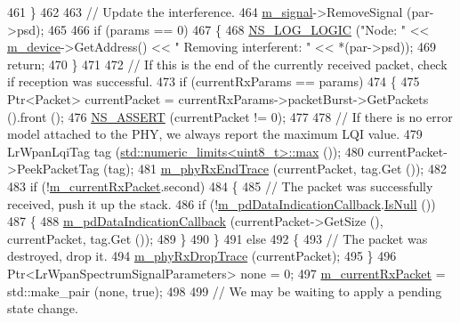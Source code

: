\begin{DoxyCode}
461     \}
462 
463   \textcolor{comment}{// Update the interference.}
464   \hyperlink{classns3_1_1LrWpanPhy_a923130b0bacef678012bcc8fdc68fd10}{m\_signal}->RemoveSignal (par->psd);
465 
466   \textcolor{keywordflow}{if} (params == 0)
467     \{
468       \hyperlink{group__logging_ga88acd260151caf2db9c0fc84997f45ce}{NS\_LOG\_LOGIC} (\textcolor{stringliteral}{"Node: "} << \hyperlink{classns3_1_1LrWpanPhy_a406001d3cb4da3828837c1c1b4629a9c}{m\_device}->GetAddress() << \textcolor{stringliteral}{" Removing interferent: "} << 
      *(par->psd));
469       \textcolor{keywordflow}{return};
470     \}
471 
472   \textcolor{comment}{// If this is the end of the currently received packet, check if reception was successful.}
473   \textcolor{keywordflow}{if} (currentRxParams == params)
474     \{
475       Ptr<Packet> currentPacket = currentRxParams->packetBurst->GetPackets ().front ();
476       \hyperlink{assert_8h_a6dccdb0de9b252f60088ce281c49d052}{NS\_ASSERT} (currentPacket != 0);
477 
478       \textcolor{comment}{// If there is no error model attached to the PHY, we always report the maximum LQI value.}
479       LrWpanLqiTag tag (\hyperlink{80211b_8c_affe776513b24d84b39af8ab0930fef7f}{std::numeric\_limits<uint8\_t>::max} ());
480       currentPacket->PeekPacketTag (tag);
481       \hyperlink{classns3_1_1LrWpanPhy_a6d8ee60f128cdce862893fc9e0e5eda3}{m\_phyRxEndTrace} (currentPacket, tag.Get ());
482 
483       \textcolor{keywordflow}{if} (!\hyperlink{classns3_1_1LrWpanPhy_a5e25bc6b183652edc17015d04cca92a3}{m\_currentRxPacket}.second)
484         \{
485           \textcolor{comment}{// The packet was successfully received, push it up the stack.}
486           \textcolor{keywordflow}{if} (!\hyperlink{classns3_1_1LrWpanPhy_a94de3241a0050cc21f5a57fdbc951c9e}{m\_pdDataIndicationCallback}.\hyperlink{classns3_1_1Callback_aa8e27826badbf37f84763f36f70d9b54}{IsNull} ())
487             \{
488               \hyperlink{classns3_1_1LrWpanPhy_a94de3241a0050cc21f5a57fdbc951c9e}{m\_pdDataIndicationCallback} (currentPacket->GetSize (), 
      currentPacket, tag.Get ());
489             \}
490         \}
491       \textcolor{keywordflow}{else}
492         \{
493           \textcolor{comment}{// The packet was destroyed, drop it.}
494           \hyperlink{classns3_1_1LrWpanPhy_aa649b07e1ef1151e1758c5091e6a7a00}{m\_phyRxDropTrace} (currentPacket);
495         \}
496       Ptr<LrWpanSpectrumSignalParameters> none = 0;
497       \hyperlink{classns3_1_1LrWpanPhy_a5e25bc6b183652edc17015d04cca92a3}{m\_currentRxPacket} = std::make\_pair (none, \textcolor{keyword}{true});
498 
499       \textcolor{comment}{// We may be waiting to apply a pending state change.}

\end{DoxyCode}
